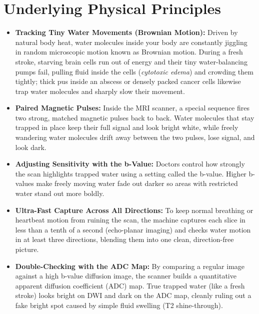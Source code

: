 \section{Underlying Physical Principles}
\begin{itemize}
\item \textbf{Tracking Tiny Water Movements (Brownian Motion):} Driven by natural body heat, water molecules inside your body are constantly jiggling in random microscopic motion known as Brownian motion. During a fresh stroke, starving brain cells run out of energy and their tiny water-balancing pumps fail, pulling fluid inside the cells (\textit{cytotoxic edema}) and crowding them tightly; thick pus inside an abscess or densely packed cancer cells likewise trap water molecules and sharply slow their movement.
\item \textbf{Paired Magnetic Pulses:} Inside the MRI scanner, a special sequence fires two strong, matched magnetic pulses back to back. Water molecules that stay trapped in place keep their full signal and look bright white, while freely wandering water molecules drift away between the two pulses, lose signal, and look dark.
\item \textbf{Adjusting Sensitivity with the b-Value:} Doctors control how strongly the scan highlights trapped water using a setting called the b-value. Higher b-values make freely moving water fade out darker so areas with restricted water stand out more boldly.
\item \textbf{Ultra-Fast Capture Across All Directions:} To keep normal breathing or heartbeat motion from ruining the scan, the machine captures each slice in less than a tenth of a second (echo-planar imaging) and checks water motion in at least three directions, blending them into one clean, direction-free picture.
\item \textbf{Double-Checking with the ADC Map:} By comparing a regular image against a high b-value diffusion image, the scanner builds a quantitative apparent diffusion coefficient (ADC) map. True trapped water (like a fresh stroke) looks bright on DWI and dark on the ADC map, cleanly ruling out a fake bright spot caused by simple fluid swelling (T2 shine-through).
\end{itemize}

